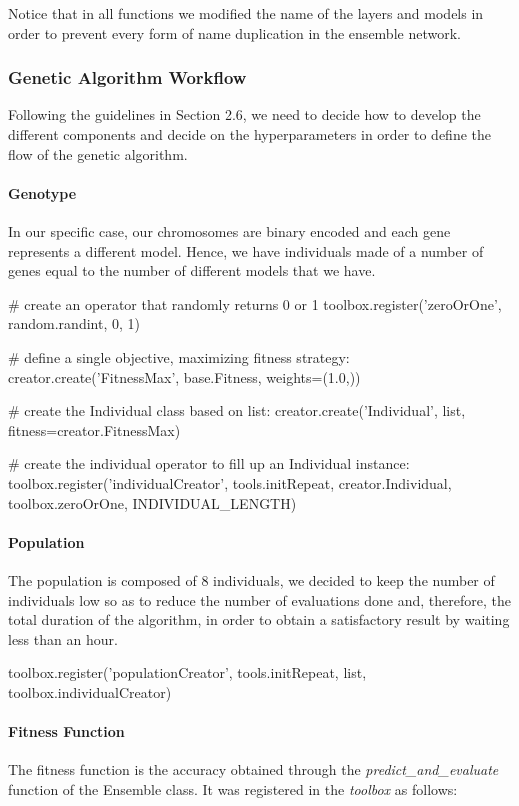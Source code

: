 Notice that in all functions we modified the name of the layers and models in order to prevent every form of name duplication in the ensemble network.  

\subsubsection{Genetic Algorithm Workflow}
Following the guidelines in Section 2.6, we need to decide how to develop the different components and decide on the hyperparameters in order to define the flow of the genetic algorithm.

\paragraph{Genotype}
In our specific case, our chromosomes are binary encoded and each gene represents a different model. Hence, we have individuals made of a number of genes equal to the number of different models that we have.

\begin{python}
# create an operator that randomly returns 0 or 1
toolbox.register('zeroOrOne', random.randint, 0, 1)

# define a single objective, maximizing fitness strategy:
creator.create('FitnessMax', base.Fitness, weights=(1.0,))

# create the Individual class based on list:
creator.create('Individual', list, fitness=creator.FitnessMax)

# create the individual operator to fill up an Individual instance:
toolbox.register('individualCreator', tools.initRepeat, creator.Individual, toolbox.zeroOrOne, INDIVIDUAL_LENGTH)
\end{python}

\paragraph{Population}
The population is composed of 8 individuals, we decided to keep the number of individuals low so as to reduce the number of evaluations done and, therefore, the total duration of the algorithm, in order to obtain a satisfactory result by waiting less than an hour.

\begin{python}
toolbox.register('populationCreator', tools.initRepeat, list, toolbox.individualCreator)
\end{python}

\paragraph{Fitness Function}
The fitness function is the accuracy obtained through the \textit{predict\_and\_evaluate} function of the Ensemble class. It was registered in the \textit{toolbox} as follows:

